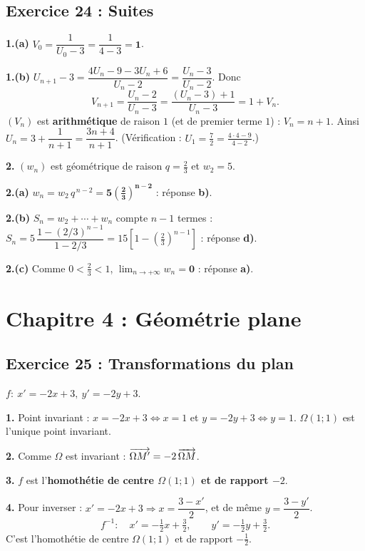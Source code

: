 \subsection{Exercice 24 : Suites}

\textbf{1.(a)} $V_0=\dfrac{1}{U_0-3}=\dfrac{1}{4-3}=\mathbf{1}$.

\textbf{1.(b)} $U_{n+1}-3=\dfrac{4U_n-9-3U_n+6}{U_n-2}=\dfrac{U_n-3}{U_n-2}$. Donc
\[
V_{n+1}=\frac{U_n-2}{U_n-3}=\frac{(U_n-3)+1}{U_n-3}=1+V_n.
\]
$(V_n)$ est \textbf{arithm\'etique} de raison $1$ (et de premier terme $1$) : $V_n=n+1$.
Ainsi $U_n=3+\dfrac{1}{n+1}=\dfrac{3n+4}{n+1}$. (V\'erification : $U_1=\frac72=\frac{4\cdot4-9}{4-2}$.)

\textbf{2.} $(w_n)$ est g\'eom\'etrique de raison $q=\frac23$ et $w_2=5$.

\textbf{2.(a)} $w_n=w_2\,q^{\,n-2}=\mathbf{5\left(\tfrac23\right)^{n-2}}$ : r\'eponse \textbf{b)}.

\textbf{2.(b)} $S_n=w_2+\cdots+w_n$ compte $n-1$ termes :
$S_n=5\,\dfrac{1-(2/3)^{n-1}}{1-2/3}=15\left[1-\left(\tfrac23\right)^{n-1}\right]$ : r\'eponse \textbf{d)}.

\textbf{2.(c)} Comme $0<\frac23<1$, $\lim_{n\to+\infty}w_n=\mathbf{0}$ : r\'eponse \textbf{a)}.

\section{Chapitre 4 : G\'eom\'etrie plane}

\subsection{Exercice 25 : Transformations du plan}

$f:\ x'=-2x+3,\ y'=-2y+3$.

\textbf{1.} Point invariant : $x=-2x+3\iff x=1$ et $y=-2y+3\iff y=1$. \textbf{$\Omega(1;1)$} est l'unique point invariant.

\textbf{2.} Comme $\Omega$ est invariant : $\overrightarrow{\Omega M'}=-2\,\overrightarrow{\Omega M}$.

\textbf{3.} $f$ est l'\textbf{homoth\'etie de centre $\Omega(1;1)$ et de rapport $-2$}.

\textbf{4.} Pour inverser : $x'=-2x+3\Rightarrow x=\dfrac{3-x'}{2}$, et de m\^eme $y=\dfrac{3-y'}{2}$.
\[
f^{-1}:\quad x'=-\tfrac12x+\tfrac32,\qquad y'=-\tfrac12y+\tfrac32.
\]
C'est l'homoth\'etie de centre $\Omega(1;1)$ et de rapport $-\frac12$.

